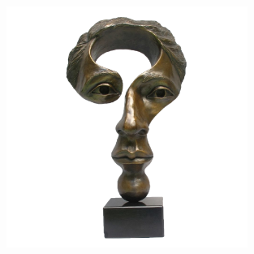 \documentclass{beamer}
\theoremstyle{definition}
\begin{document}
\begin{frame}{}

\begin{figure}[H]
    \centering
    \includegraphics[width=0.7\textwidth]{img/QuestioningMind.png}
\end{figure}

\end{frame}
\end{document}
